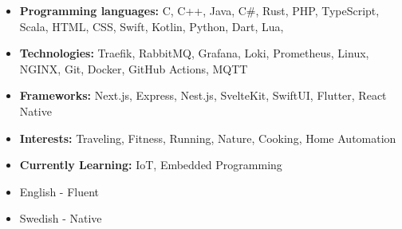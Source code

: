 







\begin{itemize}
\item \textbf{Programming languages:} C, C++, Java, C\#, Rust, PHP, TypeScript, Scala, HTML, CSS, Swift, Kotlin, Python, Dart, Lua, 
\item \textbf{Technologies:} Traefik, RabbitMQ, Grafana, Loki, Prometheus, Linux, NGINX, Git, Docker, GitHub Actions, MQTT
\item \textbf{Frameworks:} Next.js, Express, Nest.js, SvelteKit, SwiftUI, Flutter, React Native
\item \textbf{Interests:} Traveling, Fitness, Running, Nature, Cooking, Home Automation
\item \textbf{Currently Learning:} IoT, Embedded Programming
\end{itemize}

\begin{itemize}
    \item English - Fluent
    \item Swedish - Native
\end{itemize}



